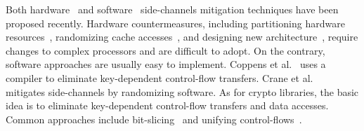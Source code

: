 Both hardware~\cite{Page2005PartitionedCA,
    Wang:2007:NCD:1250662.1250723,Zhang:2015:HDL:2775054.2694372,Li:2014:SLH:2541940.2541947,
    236344, 236334} and software~\cite{shih2017t,Coppens:2009:PMT:1607723.1608124,
    brickell2006software,crane2015thwarting, 197207} side-channels mitigation techniques have
been proposed recently. Hardware countermeasures, including partitioning hardware resources~\cite{Page2005PartitionedCA}, randomizing cache
accesses~\cite{Wang:2007:NCD:1250662.1250723, 236344}, and designing new
architecture~\cite{tiwari2011crafting}, require changes to complex processors and are difficult to adopt. On the contrary, software approaches are
usually easy to implement. Coppens et
al.~\cite{Coppens:2009:PMT:1607723.1608124} uses a compiler
to eliminate key-dependent control-flow transfers. Crane et
al.~\cite{crane2015thwarting} mitigates side-channels by randomizing software.
As for crypto libraries, the basic idea is to eliminate key-dependent
control-flow transfers and data accesses. Common approaches include
bit-slicing~\cite{konighofer2008fast,rebeiro2006bitslice} and unifying
control-flows~\cite{Coppens:2009:PMT:1607723.1608124}.

